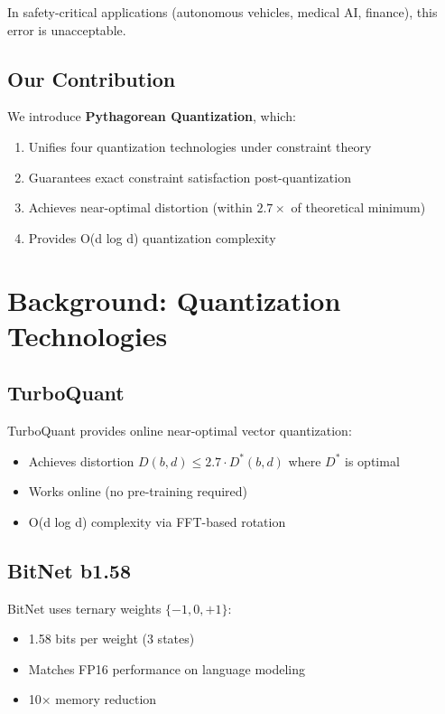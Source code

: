 \documentclass{article}
\begin{document}
In safety-critical applications (autonomous vehicles, medical AI, finance), this error is unacceptable.

\subsection{Our Contribution}

We introduce \textbf{Pythagorean Quantization}, which:

\begin{enumerate}
    \item Unifies four quantization technologies under constraint theory
    \item Guarantees exact constraint satisfaction post-quantization
    \item Achieves near-optimal distortion (within $2.7\times$ of theoretical minimum)
    \item Provides O(d log d) quantization complexity
\end{enumerate}

\section{Background: Quantization Technologies}

\subsection{TurboQuant}

TurboQuant provides online near-optimal vector quantization:

\begin{itemize}
    \item Achieves distortion $D(b,d) \leq 2.7 \cdot D^*(b,d)$ where $D^*$ is optimal
    \item Works online (no pre-training required)
    \item O(d log d) complexity via FFT-based rotation
\end{itemize}

\subsection{BitNet b1.58}

BitNet uses ternary weights $\{-1, 0, +1\}$:

\begin{itemize}
    \item 1.58 bits per weight (3 states)
    \item Matches FP16 performance on language modeling
    \item 10$\times$ memory reduction
\end{itemize}
\end{document}
